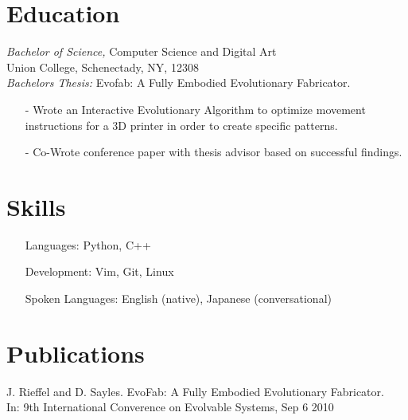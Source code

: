 \documentclass[margin, 10pt]{res} %
\begin{document}
\begin{resume}


\section{Education}

{\sl Bachelor of Science,} Computer Science and Digital Art \\
Union College, Schenectady, NY, 12308 \\
{\sl Bachelors Thesis:} Evofab: A Fully Embodied Evolutionary Fabricator.
\begin{itemize} \itemsep -2pt
\item[-] Wrote an Interactive Evolutionary Algorithm to optimize movement instructions for a 3D printer in order to create specific patterns.
\item[-] Co-Wrote conference paper with thesis advisor based on successful findings.
\end{itemize}
 

\section{Skills} 

\begin{itemize} \itemsep -2pt
\setlength{\itemindent}{-25pt}
\item[] Languages: Python, C++
\item[] Development: Vim, Git, Linux
\item[] Spoken Languages: English (native), Japanese (conversational)
\end{itemize}

 
\section{Publications}
J. Rieffel and D. Sayles. EvoFab: A Fully Embodied Evolutionary Fabricator.  \\In: 9th International Converence on Evolvable Systems, Sep 6 2010 \\


\end{resume}
\end{document}
